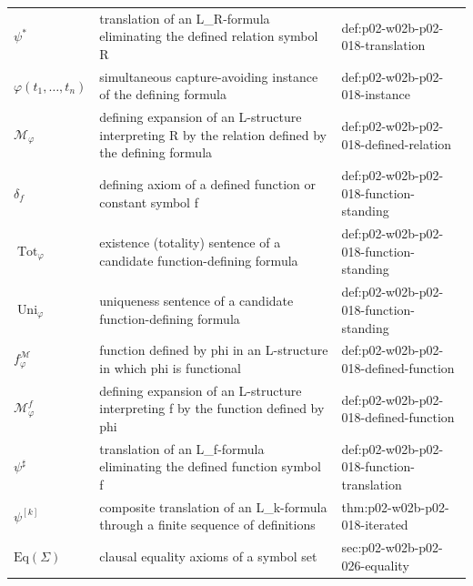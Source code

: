 \begin{longtable}{@{}p{}p{}p{}@{}}
\(\psi^{*}\) & translation of an L\_R-formula eliminating the defined relation symbol R & def:\allowbreak{}p02-\allowbreak{}w02b-\allowbreak{}p02-\allowbreak{}018-\allowbreak{}translation \\
\(\varphi(t_1,\allowbreak \ldots,\allowbreak t_n)\) & simultaneous capture-avoiding instance of the defining formula & def:\allowbreak{}p02-\allowbreak{}w02b-\allowbreak{}p02-\allowbreak{}018-\allowbreak{}instance \\
\(\mathcal M_{\varphi}\) & defining expansion of an L-structure interpreting R by the relation defined by the defining formula & def:\allowbreak{}p02-\allowbreak{}w02b-\allowbreak{}p02-\allowbreak{}018-\allowbreak{}defined-\allowbreak{}relation \\
\(\delta_f\) & defining axiom of a defined function or constant symbol f & def:\allowbreak{}p02-\allowbreak{}w02b-\allowbreak{}p02-\allowbreak{}018-\allowbreak{}function-\allowbreak{}standing \\
\(\operatorname{Tot}_{\varphi}\) & existence (totality) sentence of a candidate function-defining formula & def:\allowbreak{}p02-\allowbreak{}w02b-\allowbreak{}p02-\allowbreak{}018-\allowbreak{}function-\allowbreak{}standing \\
\(\operatorname{Uni}_{\varphi}\) & uniqueness sentence of a candidate function-defining formula & def:\allowbreak{}p02-\allowbreak{}w02b-\allowbreak{}p02-\allowbreak{}018-\allowbreak{}function-\allowbreak{}standing \\
\(f^{\mathcal M}_{\varphi}\) & function defined by phi in an L-structure in which phi is functional & def:\allowbreak{}p02-\allowbreak{}w02b-\allowbreak{}p02-\allowbreak{}018-\allowbreak{}defined-\allowbreak{}function \\
\(\mathcal M^{f}_{\varphi}\) & defining expansion of an L-structure interpreting f by the function defined by phi & def:\allowbreak{}p02-\allowbreak{}w02b-\allowbreak{}p02-\allowbreak{}018-\allowbreak{}defined-\allowbreak{}function \\
\(\psi^{\sharp}\) & translation of an L\_f-formula eliminating the defined function symbol f & def:\allowbreak{}p02-\allowbreak{}w02b-\allowbreak{}p02-\allowbreak{}018-\allowbreak{}function-\allowbreak{}translation \\
\(\psi^{[k]}\) & composite translation of an L\_k-formula through a finite sequence of definitions & thm:\allowbreak{}p02-\allowbreak{}w02b-\allowbreak{}p02-\allowbreak{}018-\allowbreak{}iterated \\
\(\mathrm{Eq}(\Sigma)\) & clausal equality axioms of a symbol set & sec:\allowbreak{}p02-\allowbreak{}w02b-\allowbreak{}p02-\allowbreak{}026-\allowbreak{}equality \\

\end{longtable}

